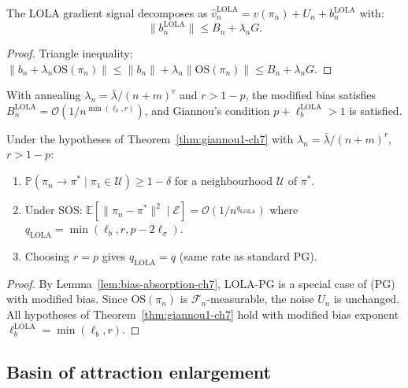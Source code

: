 \begin{lemma}
\label{lem:bias-absorption-ch7}
The LOLA gradient signal decomposes as $\hat{v}_n^{\mathrm{LOLA}} = v(\pi_n) + U_n + b_n^{\mathrm{LOLA}}$ with:
\begin{equation}
    \|b_n^{\mathrm{LOLA}}\| \leq B_n + \lambda_n G.
\end{equation}
\end{lemma}

\begin{proof}
Triangle inequality: $\|b_n + \lambda_n \mathrm{OS}(\pi_n)\| \leq \|b_n\| + \lambda_n \|\mathrm{OS}(\pi_n)\| \leq B_n + \lambda_n G$.
\end{proof}

With annealing $\lambda_n = \bar{\lambda}/(n+m)^r$ and $r > 1-p$, the modified bias satisfies $B_n^{\mathrm{LOLA}} = \mathcal{O}(1/n^{\min(\ell_b, r)})$, and Giannou's condition $p + \ell_b^{\mathrm{LOLA}} > 1$ is satisfied.

\begin{theorem}
\label{thm:annealed-ch7}
Under the hypotheses of Theorem~\ref{thm:giannou1-ch7} with $\lambda_n = \bar{\lambda}/(n+m)^r$, $r > 1 - p$:
\begin{enumerate}
    \item $\mathbb{P}(\pi_n \to \pi^* \mid \pi_1 \in \mathcal{U}) \geq 1 - \delta$ for a neighbourhood $\mathcal{U}$ of $\pi^*$.
    \item Under SOS: $\mathbb{E}[\|\pi_n - \pi^*\|^2 \mid \mathcal{E}] = \mathcal{O}(1/n^{q_{\mathrm{LOLA}}})$ where $q_{\mathrm{LOLA}} = \min(\ell_b, r, p - 2\ell_\sigma)$.
    \item Choosing $r = p$ gives $q_{\mathrm{LOLA}} = q$ (same rate as standard PG).
\end{enumerate}
\end{theorem}

\begin{proof}
By Lemma~\ref{lem:bias-absorption-ch7}, LOLA-PG is a special case of (PG) with modified bias. Since $\mathrm{OS}(\pi_n)$ is $\mathcal{F}_n$-measurable, the noise $U_n$ is unchanged. All hypotheses of Theorem~\ref{thm:giannou1-ch7} hold with modified bias exponent $\ell_b^{\mathrm{LOLA}} = \min(\ell_b, r)$.
\end{proof}

\subsection{Basin of attraction enlargement}

